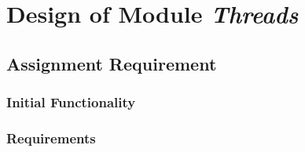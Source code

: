 
\chapter{Design of Module \textit{Threads}}


\section{Assignment Requirement}


\subsection{Initial Functionality}


\subsection{Requirements}

